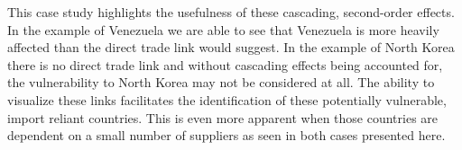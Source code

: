 This case study highlights the usefulness of these cascading, second-order effects. In the example of Venezuela we are able to see that Venezuela is more heavily affected than the direct trade link would suggest. In the example of North Korea there is no direct trade link and without cascading effects being accounted for, the vulnerability to North Korea may not be considered at all. The ability to visualize these links facilitates the identification of these potentially vulnerable, import reliant countries. This is even more apparent when those countries are dependent on a small number of suppliers as seen in both cases presented here.\par
